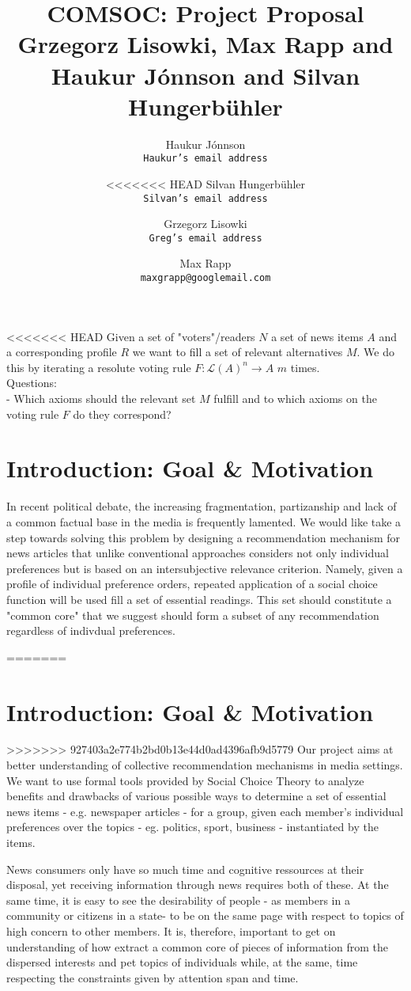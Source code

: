 \documentclass[10pt,a4paper,english]{article}
\author{
    Haukur J{\'o}nnson\\    \texttt{Haukur's email address}
    \and
<<<<<<< HEAD
    Silvan Hungerb{\"u}hler\\   \texttt{Silvan's email address}
    \and
    Grzegorz Lisowki\\  \texttt{Greg's email address}
    \and
    Max Rapp\\  \texttt{maxgrapp@googlemail.com}
}
\title{%
  COMSOC: Project Proposal \\
  \small Grzegorz Lisowki, Max Rapp and Haukur J{\'o}nnson and Silvan Hungerb{\"u}hler }
\date{}
\begin{document}
\maketitle
<<<<<<< HEAD
Given a set of "voters"/readers $N$ a set of news items $A$ and a corresponding profile $R$ we want to fill a set of relevant alternatives $M$. We do this by iterating a resolute voting rule $F:\mathcal{L}(A)^n \rightarrow A$ $m$ times.\\

Questions:\\
- Which axioms should the relevant set $M$ fulfill and to which axioms on the voting rule $F$ do they correspond?
\section*{Introduction: Goal \& Motivation}

In recent political debate, the increasing fragmentation, partizanship and lack of a common factual base in the media is frequently lamented. We would like take a step towards solving this problem by designing a recommendation mechanism for news articles that unlike conventional approaches considers not only individual preferences but is based on an intersubjective relevance criterion. Namely, given a profile of individual preference orders, repeated application of a social choice function will be used fill a set of essential readings. This set should constitute a "common core" that we suggest should form a subset of any recommendation regardless of indivdual preferences.

=======
\section{Introduction: Goal \& Motivation}
>>>>>>> 927403a2e774b2bd0b13e44d0ad4396afb9d5779
Our project aims at better understanding of collective recommendation mechanisms in media settings. We want to use formal tools provided by Social Choice Theory to analyze benefits and drawbacks of various possible ways to determine a set of essential news items - e.g. newspaper articles - for a group, given each member's individual preferences over the topics - eg. politics, sport, business - instantiated by the items.

News consumers only have so much time and cognitive ressources at their disposal, yet receiving information through news requires both of these. At the same time, it is easy to see the desirability of people - as members in a community or citizens in a state- to be on the same page with respect to topics of high concern to other members. It is, therefore, important to get on understanding of how extract a common core of pieces of information from the dispersed interests and pet topics of individuals while, at the same, time respecting the constraints given by attention span and time.
\end{document}
